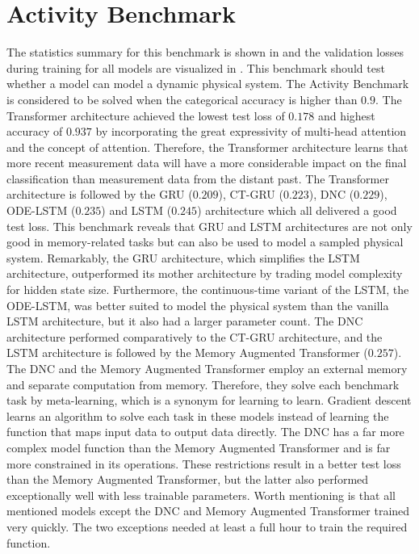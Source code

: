 \documentclass[draft,final]{vutinfth} %
\begin{document}
    \section{Activity Benchmark} \label{activity_results}
    The statistics summary for this benchmark is shown in  and the validation losses during training for all models are visualized in .
    This benchmark should test whether a model can model a dynamic physical system.
    The Activity Benchmark is considered to be solved when the categorical accuracy is higher than $0.9$.
    The Transformer architecture achieved the lowest test loss of $0.178$ and highest accuracy of $0.937$ by incorporating the great expressivity of multi-head attention and the concept of attention.
    Therefore, the Transformer architecture learns that more recent measurement data will have a more considerable impact on the final classification than measurement data from the distant past.
    The Transformer architecture is followed by the GRU ($0.209$), CT-GRU ($0.223$), DNC ($0.229$), ODE-LSTM ($0.235$) and LSTM ($0.245$) architecture which all delivered a good test loss.
    This benchmark reveals that GRU and LSTM architectures are not only good in memory-related tasks but can also be used to model a sampled physical system.
    Remarkably, the GRU architecture, which simplifies the LSTM architecture, outperformed its mother architecture by trading model complexity for hidden state size.
    Furthermore, the continuous-time variant of the LSTM, the ODE-LSTM, was better suited to model the physical system than the vanilla LSTM architecture, but it also had a larger parameter count.
    The DNC architecture performed comparatively to the CT-GRU architecture, and the LSTM architecture is followed by the Memory Augmented Transformer ($0.257$).
    The DNC and the Memory Augmented Transformer employ an external memory and separate computation from memory.
    Therefore, they solve each benchmark task by meta-learning, which is a synonym for learning to learn.
    Gradient descent learns an algorithm to solve each task in these models instead of learning the function that maps input data to output data directly.
    The DNC has a far more complex model function than the Memory Augmented Transformer and is far more constrained in its operations.
    These restrictions result in a better test loss than the Memory Augmented Transformer, but the latter also performed exceptionally well with less trainable parameters.
    Worth mentioning is that all mentioned models except the DNC and Memory Augmented Transformer trained very quickly. The two exceptions needed at least a full hour to train the required function.
\end{document}

